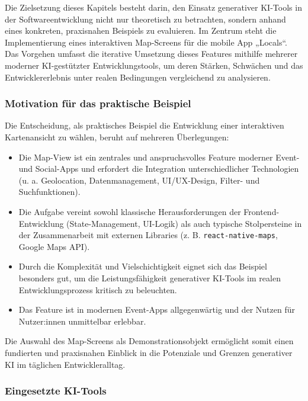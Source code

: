 Die Zielsetzung dieses Kapitels besteht darin, den Einsatz generativer KI-Tools
in der Softwareentwicklung nicht nur theoretisch zu betrachten, sondern anhand
eines konkreten, praxisnahen Beispiels zu evaluieren. Im Zentrum steht die
Implementierung eines interaktiven Map-Screens für die mobile App „Locals“. Das
Vorgehen umfasst die iterative Umsetzung dieses Features mithilfe mehrerer
moderner KI-gestützter Entwicklungstools, um deren Stärken, Schwächen und das
Entwicklererlebnis unter realen Bedingungen vergleichend zu analysieren.

\subsubsection{Motivation für das praktische Beispiel}

Die Entscheidung, als praktisches Beispiel die Entwicklung einer interaktiven
Kartenansicht zu wählen, beruht auf mehreren Überlegungen:
\begin{itemize}
      \item Die Map-View ist ein zentrales und anspruchsvolles Feature moderner Event- und
            Social-Apps und erfordert die Integration unterschiedlicher Technologien (u. a.
            Geolocation, Datenmanagement, UI/UX-Design, Filter- und Suchfunktionen).
      \item Die Aufgabe vereint sowohl klassische Herausforderungen der
            Frontend-Entwicklung (State-Management, UI-Logik) als auch typische
            Stolpersteine in der Zusammenarbeit mit externen Libraries (z. B.
            \texttt{react-native-maps}, Google Maps API).
      \item Durch die Komplexität und Vielschichtigkeit eignet sich das Beispiel besonders
            gut, um die Leistungsfähigkeit generativer KI-Tools im realen
            Entwicklungsprozess kritisch zu beleuchten.
      \item Das Feature ist in modernen Event-Apps allgegenwärtig und der Nutzen für
            Nutzer:innen unmittelbar erlebbar.
\end{itemize}
Die Auswahl des Map-Screens als Demonstrationsobjekt ermöglicht somit einen fundierten und praxisnahen Einblick in die Potenziale und Grenzen generativer KI im täglichen Entwickleralltag.

\subsubsection{Eingesetzte KI-Tools}

